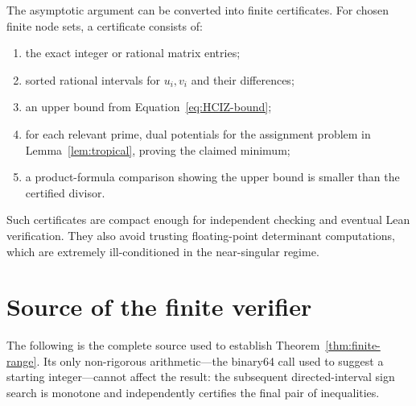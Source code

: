 \documentclass[11pt,oneside]{article}
\theoremstyle{definition}
\theoremstyle{remark}
\begin{document}
The asymptotic argument can be converted into finite certificates.  For chosen
finite node sets, a certificate consists of:
\begin{enumerate}
\item the exact integer or rational matrix entries;
\item sorted rational intervals for $u_i,v_i$ and their differences;
\item an upper bound from Equation~\eqref{eq:HCIZ-bound};
\item for each relevant prime, dual potentials for the assignment problem in
      Lemma~\ref{lem:tropical}, proving the claimed minimum;
\item a product-formula comparison showing the upper bound is smaller than the
      certified divisor.
\end{enumerate}
Such certificates are compact enough for independent checking and eventual
Lean verification.  They also avoid trusting floating-point determinant
computations, which are extremely ill-conditioned in the near-singular regime.


\section{Source of the finite verifier}
\label{app:finite-verifier}

The following is the complete source used to establish
Theorem~\ref{thm:finite-range}.  Its only non-rigorous arithmetic---the
binary64 call used to suggest a starting integer---cannot affect the result:
the subsequent directed-interval sign search is monotone and independently
certifies the final pair of inequalities.
\end{document}
